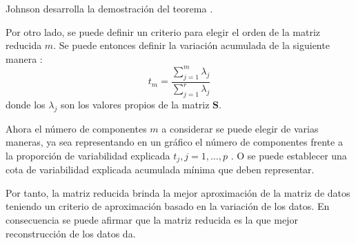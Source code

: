 \noindent Johnson desarrolla la demostración del teorema \cite{Johnson 1963}. 

\noindent Por otro lado, se puede definir un criterio para elegir el orden de la matriz reducida $m$. Se puede entonces definir la variación acumulada de la siguiente manera \cite{Chatfield 1989}:
\begin{equation}
t_m=\dfrac{\sum_{j=1}^{m}\lambda_j} {\sum_{j=1}^{r}\lambda_j}
\end{equation}
\noindent donde los $\lambda_j$ son los valores propios de la matriz $\mathbf{S}$.

\noindent Ahora el número de componentes $m$ a considerar se puede elegir de varias maneras, ya sea representando en un gráfico el número de componentes frente a la proporción de variabilidad explicada $t_j, j=1,\ldots, p$ \cite{Jollife 1986, Peña 2002}. O se puede establecer una cota de variabilidad explicada acumulada mínima que deben representar.  

\noindent Por tanto, la matriz reducida brinda la mejor aproximación de la matriz de datos teniendo un criterio de aproximación basado en la variación de los datos. En consecuencia se puede afirmar que la matriz reducida es la que mejor reconstrucción de los datos da.




